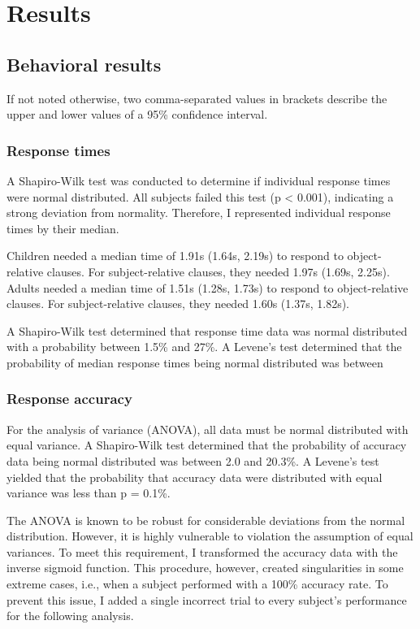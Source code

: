  
\chapter{Results}\label{results}

\section{Behavioral results}

If not noted otherwise, two comma-separated values in brackets describe the upper and lower values of a 95\% confidence interval.

\subsection{Response times}

A Shapiro-Wilk test was conducted to determine if individual response times were normal distributed.
All subjects failed this test (p < 0.001), indicating a strong deviation from normality.
Therefore, I represented individual response times by their median.

Children needed a median time of 1.91s (1.64s, 2.19s) to respond to object-relative clauses.
For subject-relative clauses, they needed 1.97s (1.69s, 2.25s).
Adults needed a median time of 1.51s (1.28s, 1.73s) to respond to object-relative clauses.
For subject-relative clauses, they needed 1.60s (1.37s, 1.82s).

A Shapiro-Wilk test determined that response time data was normal distributed with a probability between 1.5\% and 27\%.
A Levene's test determined that the probability of median response times being normal distributed was between 

\subsection{Response accuracy}

For the analysis of variance (ANOVA), all data must be normal distributed with equal variance.
A Shapiro-Wilk test determined that the probability of accuracy data being normal distributed was between 2.0 and 20.3\%.
A Levene's test yielded that the probability that accuracy data were distributed with equal variance was less than p = 0.1\%.

The ANOVA is known to be robust for considerable deviations from the normal distribution.
However, it is highly vulnerable to violation the assumption of equal variances.
To meet this requirement, I transformed the accuracy data with the inverse sigmoid function.
This procedure, however, created singularities in some extreme cases, i.e., when a subject performed with a 100\% accuracy rate.
To prevent this issue, I added a single incorrect trial to every subject's performance for the following analysis.

